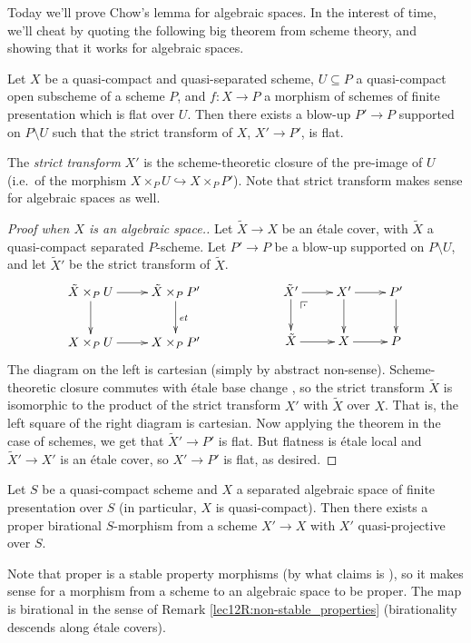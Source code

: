 

 Today we'll prove Chow's lemma for algebraic spaces. In the interest of time, we'll
 cheat by quoting the following big theorem from scheme theory, and showing that it works
 for algebraic spaces.
 \begin{theorem} \label{lec18T:RGblow-up}
   Let $X$ be a quasi-compact and quasi-separated scheme, $U\subseteq P$ a quasi-compact
   open subscheme of a scheme $P$, and $f:X\to P$ a morphism of schemes of finite
   presentation which is flat over $U$. Then there exists a blow-up $P'\to P$ supported
   on $P\setminus U$ such that the strict transform of $X$, $X'\to P'$, is flat.
 \end{theorem}
 The \emph{strict transform} $X'$ is the scheme-theoretic closure of the pre-image of $U$
 (i.e.~of the morphism $X\times_P U\hookrightarrow X\times_P P'$). Note that strict
 transform makes sense for algebraic spaces as well.
 \begin{proof}[Proof when $X$ is an algebraic space.]
   Let $\tilde X\to X$ be an \'etale cover, with $\tilde X$ a quasi-compact separated
   $P$-scheme. Let $P'\to P$ be a blow-up supported on $P\setminus U$, and let $\tilde
   X'$ be the strict transform of $\tilde X$.
   \[\xymatrix{
      \tilde X\times_P U \ar[r]\ar[d] & \tilde X\times_P P'\ar[d]^{et}\\
      X\times_P U \ar[r] & X\times_P P'
   }\qquad\qquad\qquad
   \xymatrix{
      \tilde X'\ar[d] \ar[r]\ar@{}[dr]|(.25)\pb & X' \ar[d]\ar[r] & P'\ar[d]\\
      \tilde X\ar[r] & X\ar[r] & P
   }\]
    The diagram on the left is cartesian (simply by abstract non-sense). Scheme-theoretic
   closure commutes with \'etale base change , so the strict transform $\tilde X$ is isomorphic
   to the product of the strict transform $X'$ with $\tilde X$ over $X$. That is, the
   left square of the right diagram is cartesian. Now applying the theorem in the case of
   schemes, we get that $\tilde X'\to P'$ is flat. But flatness is \'etale local and
   $\tilde X'\to X'$ is an \'etale cover, so $X'\to P'$ is flat, as desired.
 \end{proof}

 \begin{theorem}
   Let $S$ be a quasi-compact scheme and $X$ a separated algebraic space of finite
   presentation over $S$ (in particular, $X$ is quasi-compact). Then there exists a proper
   birational $S$-morphism from a scheme $X'\to X$ with $X'$ quasi-projective over $S$.
 \end{theorem}
 Note that proper is a stable property morphisms (by what \cite{Vistoli} claims is
 \cite[IV.2.7.1]{EGA}), so it makes sense for a morphism from a scheme to an algebraic
 space to be proper. The map is birational in the sense of Remark
 \ref{lec12R:non-stable_properties} (birationality descends along \'etale covers).


